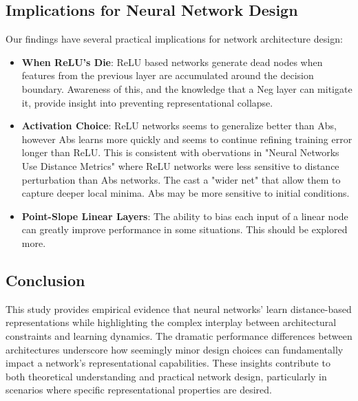 \subsection{Implications for Neural Network Design}
Our findings have several practical implications for network architecture design:

\begin{itemize}
    \item \textbf{When ReLU's Die}: ReLU based networks generate dead nodes when features from the previous layer are accumulated around the decision boundary. Awareness of this, and the knowledge that a Neg layer can mitigate it, provide insight into preventing representational collapse.
    \item \textbf{Activation Choice}: ReLU networks seems to generalize better than Abs, however Abs learns more quickly and seems to continue refining training error longer than ReLU. This is consistent with obervations in "Neural Networks Use Distance Metrics" where ReLU networks were less sensitive to distance perturbation than Abs networks. The cast a "wider net" that allow them to capture deeper local minima. Abs may be more sensitive to initial conditions.
    \item \textbf{Point-Slope Linear Layers}: The ability to bias each input of a linear node can greatly improve performance in some situations. This should be explored more.
\end{itemize}

\subsection{Conclusion}

This study provides empirical evidence that neural networks' learn distance-based representations while highlighting the complex interplay between architectural constraints and learning dynamics. The dramatic performance differences between architectures underscore how seemingly minor design choices can fundamentally impact a network's representational capabilities. These insights contribute to both theoretical understanding and practical network design, particularly in scenarios where specific representational properties are desired.
